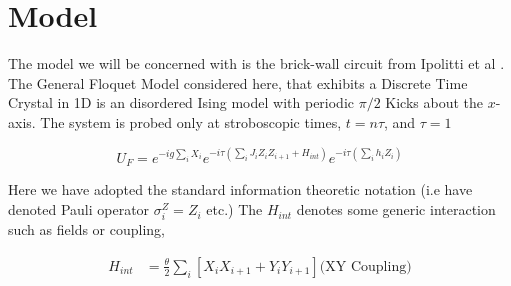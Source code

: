 \section{Model}

The model we will be concerned with is the brick-wall circuit from Ipolitti et al \cite{Khemani2021DTCinNISQ,ippolitti2022time}. The General Floquet Model considered here, that exhibits a Discrete Time Crystal in 1D is an disordered Ising model with periodic $\pi/2$ Kicks about the $x$-axis. The system is probed only at stroboscopic times, $t=n \tau$, and $\tau=1$

\begin{equation}
    U_F= e^{-ig\sum_i X_i}e^{-i\tau(\sum_{i} J_{i} Z_i Z_{i+1}+H_{int})}e^{-i\tau(\sum_{i} h_{i} Z_i)}
\end{equation}

Here we have adopted the standard information theoretic notation (i.e have denoted Pauli operator $\sigma^Z_i=Z_i$ etc.) The $H_{int}$ denotes some generic interaction such as fields or coupling, 

\begin{equation*}
\begin{split}
    H_{int}&=  \frac{\theta}{2}\sum_{i}[X_iX_{i+1}+Y_iY_{i+1}] \text{(XY Coupling)}
\end{split}
\end{equation*}


